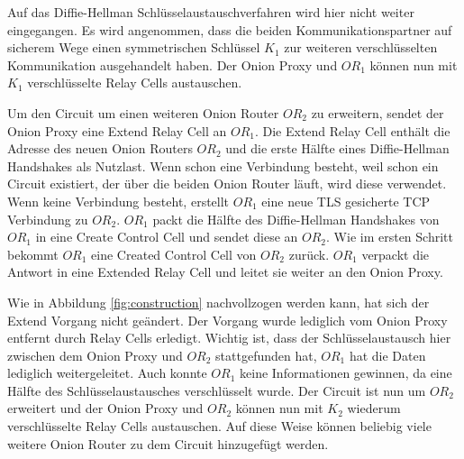 \documentclass[fleqn,envcountsame,runningheads,10pt,a4paper]{llncs}
\begin{document}
Auf das Diffie-Hellman Schlüsselaustauschverfahren \cite{dh} wird hier nicht weiter eingegangen. Es wird angenommen, dass die beiden Kommunikationspartner auf sicherem Wege einen symmetrischen Schlüssel $K_1$ zur weiteren verschlüsselten Kommunikation ausgehandelt haben. Der Onion Proxy und $\textit{OR}_1$ können nun mit $K_1$ verschlüsselte Relay Cells austauschen. 

Um den Circuit um einen weiteren Onion Router $\textit{OR}_2$ zu erweitern, sendet der Onion Proxy eine Extend Relay Cell an $\textit{OR}_1$. Die Extend Relay Cell enthält die Adresse des neuen Onion Routers $\textit{OR}_2$ und die erste Hälfte eines Diffie-Hellman Handshakes als Nutzlast. Wenn schon eine Verbindung besteht, weil schon ein Circuit existiert, der über die beiden Onion Router läuft, wird diese verwendet. Wenn keine Verbindung besteht, erstellt $\textit{OR}_1$ eine neue TLS\cite{rfc:tls} gesicherte TCP Verbindung zu $\textit{OR}_2$. $\textit{OR}_1$ packt die Hälfte des Diffie-Hellman Handshakes von $\textit{OR}_1$ in eine Create Control Cell und sendet diese an $\textit{OR}_2$. Wie im ersten Schritt bekommt $\textit{OR}_1$ eine Created Control Cell von $\textit{OR}_2$ zurück. $\textit{OR}_1$ verpackt die Antwort in eine Extended Relay Cell und leitet sie weiter an den Onion Proxy.

\begin{figure}[h]
\end{figure}

Wie in Abbildung \ref{fig:construction} nachvollzogen werden kann, hat sich der Extend Vorgang nicht geändert. Der Vorgang wurde lediglich vom Onion Proxy entfernt durch Relay Cells erledigt. Wichtig ist, dass der Schlüsselaustausch hier zwischen dem Onion Proxy und $\textit{OR}_2$ stattgefunden hat, $\textit{OR}_1$ hat die Daten lediglich weitergeleitet. Auch konnte $\textit{OR}_1$ keine Informationen gewinnen, da eine Hälfte des Schlüsselaustausches verschlüsselt wurde. Der Circuit ist nun um $\textit{OR}_2$ erweitert und der Onion Proxy und $\textit{OR}_2$ können nun mit $K_2$ wiederum verschlüsselte Relay Cells austauschen. Auf diese Weise können beliebig viele weitere Onion Router zu dem Circuit hinzugefügt werden.
\end{document}
